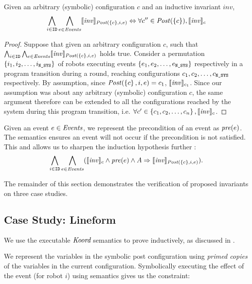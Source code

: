 \begin{lemma}
   \label{noninter}
Given an arbitrary (symbolic) configuration $c$ and an inductive invariant $\mathit{inv}$,
   {\small
   $$\bigwedge_{i\in \texttt{ID}}\bigwedge_{e \in \mathit{Events}}  \llbracket\mathit{inv}\rrbracket_{\mathit{Post}(\left\{c\right\}, i, e)} \Leftrightarrow \forall c'' \in \mathit{Post}(\left\{c\right\}), \llbracket\mathit{inv}\rrbracket_{c}$$ }
\end{lemma}
\begin{proof}
Suppose that given an arbitrary configuration $c$, such that $\bigwedge_{i\in \texttt{ID}}\bigwedge_{e \in \mathit{Events}} \llbracket\mathit{inv}\rrbracket_{\mathit{Post}(\left\{c\right\}, i, e)}$ holds true. Consider a permutation $\left\{i_1,i_2,\ldots,i_{\texttt{N\_SYS}}\right\}$ of robots executing events $\left\{e_1, e_2, \ldots , e_{\texttt{N\_SYS}}\right\}$ respectively in a program transition during a round, reaching configurations $c_1, c_2, \ldots, c_{\texttt{N\_SYS}}$ respectively. By assumption, since $\mathit{Post}(\left\{c\right\},i,e) = c_1$, $\llbracket\mathit{inv}\rrbracket_{c_1}$. Since our assumption was about any arbitrary (symbolic) configuration $c$, the same argument therefore can be extended to all the configurations reached by the system during this program transition, i.e. $\forall c' \in \left\{c_1, c_2, \ldots, c_n\right\}, \llbracket\mathit{inv}\rrbracket_{c}$.
\end{proof}

Given an event $e\in \mathit{Events}$, we represent the precondition of an event as $\mathit{pre}(e)$. The semantics ensures an event will not occur if the precondition is not satisfied. This and  allows us to sharpen the induction hypothesis further :
    $$ \bigwedge_{i\in \texttt{ID}} \bigwedge_{e \in \mathit{Events}}  (\llbracket\mathit{inv}\rrbracket_{c} \wedge \mathit{pre}(e) \wedge A \Rightarrow \llbracket\mathit{inv}\rrbracket_{\mathit{Post}(\left\{c\right\}, i, e) }).$$


The remainder of this section demonstrates the verification of proposed invariants on three case studies.


\subsection{Case Study: Lineform}

 We use the executable $\emph{Koord}$ semantics to prove  inductively, as discussed in .

We represent the variables in the symbolic post configuration using \emph{primed copies} of the variables in the current configuration. Symbolically executing the effect of the event  (for robot $i$) using \K semantics gives us the constraint:

